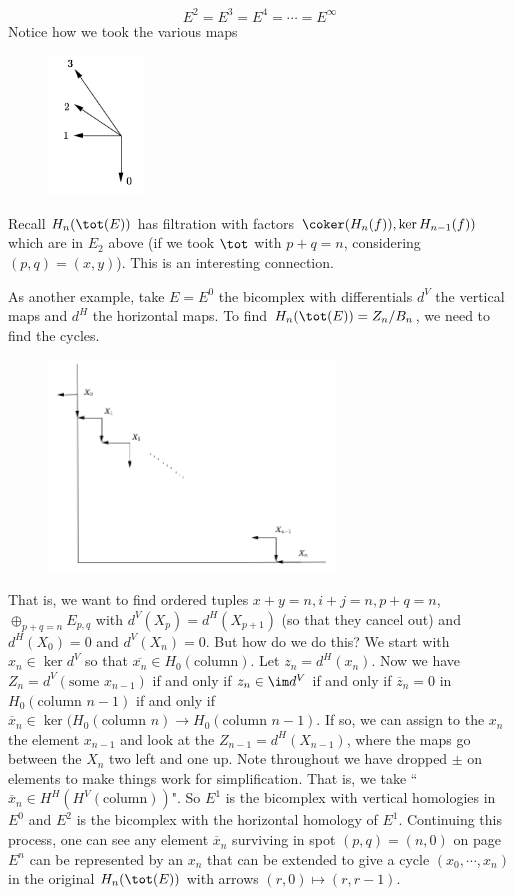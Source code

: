 \[
E^2=E^3=E^4=\cdots=E^\infty
\]
Notice how we took the various maps
\begin{figure}[h] 
   \centering
   \includegraphics[width=1in]{images/maps.png} 
\end{figure}
Recall $H_n(\tot(E))$ has filtration with factors $\coker(H_n(f)), \ker H_{n-1}(f))$ which are in $E_2$ above (if we took $\tot$ with $p+q=n$, considering $(p,q)=(x,y)$). This is an interesting connection. 

As another example, take $E=E^0$ the bicomplex with differentials $d^V$ the vertical maps and $d^H$ the horizontal maps. To find $H_n(\tot(E))=Z_n/B_n$, we need to find the cycles. 
\begin{figure}[h] 
   \centering
   \includegraphics[width=3in]{images/diagonal.png} 
\end{figure}
That is, we want to find ordered tuples $x+y=n, i+j=n, p+q=n$, $\oplus_{p+q=n} E_{p,q}$ with $d^V(X_p)=d^H(X_{p+1})$ (so that they cancel out) and $d^H(X_0)=0$ and $d^V(X_n)=0$. But how do we do this? We start with $x_n \in \ker d^V$ so that $\overline{x_n} \in H_0(\text{column})$. Let $z_n=d^H(x_n)$. Now we have $Z_n=d^V(\text{some }x_{n-1})$ if and only if $z_n \in \im d^V$ if and only if $\overline{z}_n=0$ in $H_0(\text{column }n-1)$ if and only if $\overline{x}_n \in \ker(H_0(\text{column }n) \to H_0(\text{column }n-1)$. If so, we can assign to the $x_n$ the element $x_{n-1}$ and look at the $Z_{n-1}=d^H(X_{n-1})$, where the maps go between the $X_n$ two left and one up. Note throughout we have dropped $\pm$ on elements to make things work for simplification. That is, we take ``$\overline{x}_n \in H^H(H^V(\text{column}))$". So $E^1$ is the bicomplex with vertical homologies in $E^0$ and $E^2$ is the bicomplex with the horizontal homology of $E^1$. Continuing this process, one can see any element $\overline{x}_n$ surviving in spot $(p,q)=(n,0)$ on page $E^n$ can be represented by an $x_n$ that can be extended to give a cycle $(x_0,\cdots,x_n)$ in the original $H_n(\tot(E))$ with arrows $(r,0) \mapsto (r,r-1)$.

